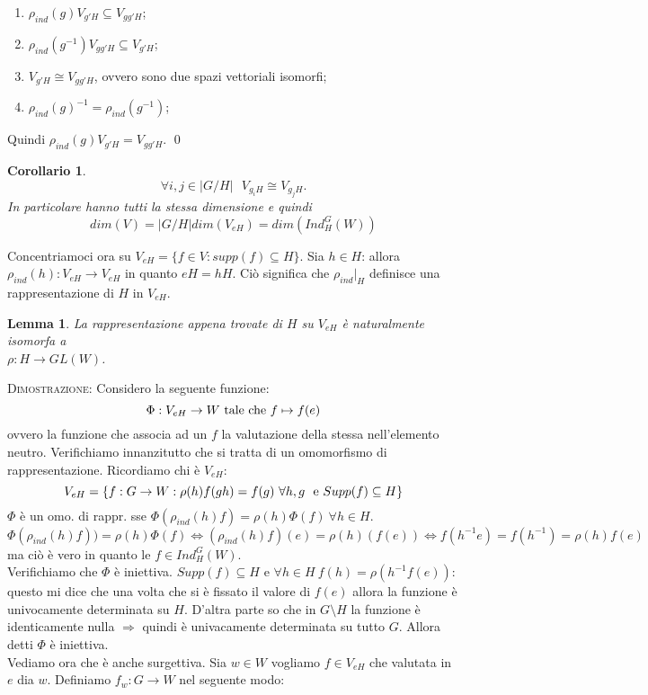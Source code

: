 \documentclass[11pt]{article}
\theoremstyle{plain}
\newtheorem{lemma}[thm]{Lemma}
\newtheorem*{cor}{Corollario}
\theoremstyle{definition}
\theoremstyle{remark}
\begin{document}
\begin{enumerate}
\item $\rho_{ind}(g)V_{g'H}\subseteq V_{gg'H}$;
\item $\rho_{ind}(g^{-1})V_{gg'H}\subseteq V_{g'H}$;
\item $V_{g'H}\cong V_{gg'H}$, ovvero sono due spazi vettoriali isomorfi;
\item $\rho_{ind}(g)^{-1}=\rho_{ind}(g^{-1})$;
\end{enumerate}
Quindi $\rho_{ind}(g)V_{g'H}=V_{gg'H}$. \qed
\\ 
\begin{cor}
\[\forall i,j\in |G/H|\ \ \ V_{g_iH}\cong V_{g_jH}.\]
In particolare hanno tutti la stessa dimensione e quindi
\[dim(V)=|G/H|dim(V_{eH})=dim(Ind_H^G(W))\]
\end{cor}
Concentriamoci ora su $V_{eH}=\{f\in V:supp(f)\subseteq H\}$. Sia $h\in H$: allora $\rho_{ind}(h):V_{eH}\rightarrow V_{eH}$ in quanto $eH=hH$. Ciò significa che $\rho_{ind}|_{H}$ definisce una rappresentazione di $H$ in $V_{eH}$.
\begin{lemma}
La rappresentazione appena trovate di $H$ su $V_{eH}$ è naturalmente isomorfa a\\ $\rho:H\rightarrow GL(W)$.
\end{lemma}
\textsc{Dimostrazione:} Considero la seguente funzione: 
\[\Phi:V_{eH}\rightarrow W\ \textup{tale che } f\mapsto f(e)\]
ovvero la funzione che associa ad un $f$ la valutazione della stessa nell'elemento neutro. Verifichiamo innanzitutto che si tratta di un omomorfismo di rappresentazione. Ricordiamo chi è $V_{eH}$:
\[V_{eH}=\{f:G\rightarrow W: \rho(h)f(gh)=f(g)\ \forall h,g\ \ \textup{e } Supp(f)\subseteq H\}\]
$\Phi$ è un omo. di rappr. sse $\Phi(\rho_{ind}(h)f)=\rho(h)\Phi(f)\ \forall h\in H$.
\[\Phi(\rho_{ind}(h)f))=\rho(h)\Phi(f) \Leftrightarrow (\rho_{ind}(h)f)(e)=\rho(h)(f(e))\Leftrightarrow f(h^{-1}e)=f(h^{-1})=\rho(h)f(e)\]
ma ciò è vero in quanto le $f\in Ind_H^G(W)$. \\
Verifichiamo che $\Phi$ è iniettiva. $Supp(f)\subseteq H$ e $\forall h\in H\ f(h)=\rho(h^{-1}f(e))$: questo mi dice che una volta che si è fissato il valore di $f(e)$ allora la funzione è univocamente determinata su $H$. D'altra parte so che in $G\setminus H$ la funzione è identicamente nulla $\Rightarrow$ quindi è univacamente determinata su tutto $G$. Allora detti $\Phi$ è iniettiva.\\
Vediamo ora che è anche surgettiva. Sia $w\in W$ vogliamo $f\in V_{eH}$ che valutata in $e$ dia $w$. Definiamo $f_w:G\rightarrow W$ nel seguente modo: 
\end{document}
